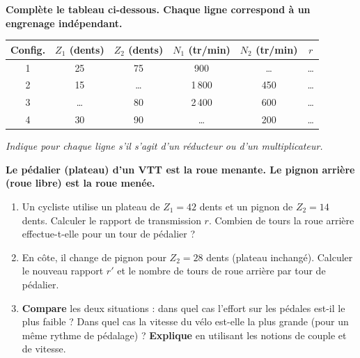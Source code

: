 \documentclass[11pt]{article}
\newcounter{popsec}
\newcounter{popsub}
\newcommand{\courssub}[1]{%
  \stepcounter{popsub}%
  \par\vspace{9pt}\noindent{\popxbold\fontsize{11.5}{13}\selectfont\color{popink}{\color{poporange}\thepopsec.\thepopsub}\hspace{6pt}#1}\par\nopagebreak\vspace{4pt}
}
\begin{document}
\courssub{Je m'entraîne}

\begin{exercice}
\textbf{Complète le tableau ci-dessous. Chaque ligne correspond à un engrenage indépendant.}
\begin{center}
\begin{tabular}{|c|c|c|c|c|c|}\hline
\textbf{Config.} & $Z_1$ (dents) & $Z_2$ (dents) & $N_1$ (tr/min) & $N_2$ (tr/min) & $r$ \\ \hline
1 & 25 & 75 & 900 & \ldots & \ldots \\ \hline
2 & 15 & \ldots & 1\,800 & 450 & \ldots \\ \hline
3 & \ldots & 80 & 2\,400 & 600 & \ldots \\ \hline
4 & 30 & 90 & \ldots & 200 & \ldots \\ \hline
\end{tabular}
\end{center}
\emph{Indique pour chaque ligne s'il s'agit d'un réducteur ou d'un multiplicateur.}
\end{exercice}

\begin{exercice}
\textbf{Le pédalier (plateau) d'un VTT est la roue menante. Le pignon arrière (roue libre) est la roue menée.}
\begin{enumerate}
    \item Un cycliste utilise un plateau de $Z_1 = 42$ dents et un pignon de $Z_2 = 14$ dents. Calculer le rapport de transmission $r$. Combien de tours la roue arrière effectue-t-elle pour un tour de pédalier ?
    \item En côte, il change de pignon pour $Z_2 = 28$ dents (plateau inchangé). Calculer le nouveau rapport $r'$ et le nombre de tours de roue arrière par tour de pédalier.
    \item \textbf{Compare} les deux situations : dans quel cas l'effort sur les pédales est-il le plus faible ? Dans quel cas la vitesse du vélo est-elle la plus grande (pour un même rythme de pédalage) ? \textbf{Explique} en utilisant les notions de couple et de vitesse.
\end{enumerate}
\end{exercice}
\end{document}

